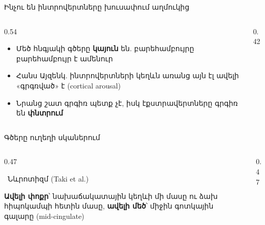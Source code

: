 \begin{frame}{Ինչու են ինտրովերտները խուսափում աղմուկից}
  \begin{columns}[c]
    \begin{column}{0.54\textwidth}
      \begin{itemize}
        \item Մեծ հնգյակի գծերը \textbf{կայուն} են. բարեհամբույրը բարեհամբույր է ամենուր
        \item<2-> Հանս Այզենկ. ինտրովերտների կեղևն առանց այն էլ ավելի «գրգռված» է (cortical arousal)
        \item<3-> Նրանց շատ գրգիռ պետք չէ, իսկ էքստրավերտները գրգիռ են \textbf{փնտրում}
      \end{itemize}
    \end{column}
    \begin{column}{0.42\textwidth}
      \centering
      \scalebox{0.78}{}
    \end{column}
  \end{columns}
\end{frame}

\begin{frame}{Գծերը ուղեղի սկաներում}
  \begin{columns}[T]
    \begin{column}{0.47\textwidth}
      \begin{card}[colback=brainpink!30!cardwhite]
        \ {\blackfont Նևրոտիզմ} {\scriptsize (Taki et al.)}\par\smallskip
        \textbf{Ավելի փոքր}՝ նախաճակատային կեղևի մի մասը ու ձախ հիպոկամպի հետին մասը, \textbf{ավելի մեծ}՝ միջին գոտկային գալարը (mid-cingulate)\par
      \end{card}
    \end{column}
    \begin{column}{0.47\textwidth}
    \end{column}
  \end{columns}
\end{frame}

